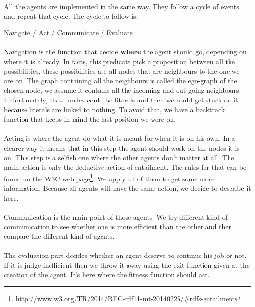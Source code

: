 \documentclass{article}
\begin{document}
		\paragraph{}
			All the agents are implemented in the same way.
			They follow a cycle of events and repeat that cycle.
			The cycle to follow is:
		\begin{center}
			Navigate / Act / Communicate / Evaluate
		\end{center}
		\paragraph{}
			Navigation is the function that decide \textbf{where} the agent should go, depending on where it is already.
			In facts, this predicate pick a proposition between all the possibilities,
			those possibilities are all nodes that are neighbours to the one we are on.
			The graph containing all the neighbours is called the ego-graph of the chosen node,
			we assume it contains all the incoming and out going neighbours.
			Unfortunately, those nodes could be literals and then we could get stuck on it because literals are linked to nothing.
			To avoid that, we have a backtrack function that keeps in mind the last position we were on.
		\paragraph{}
			Acting is where the agent do what it is meant for when it is on his own.
			In a clearer way it means that in this step the agent should work on the nodes it is on.
			This step is a selfish one where the other agents don't matter at all.
			The main action is only the deductive action of entailment.
			The rules for that can be found on the W3C web page\footnote{ \url{http://www.w3.org/TR/2014/REC-rdf11-mt-20140225/\#rdfs-entailment}}.
			We apply all of them to get some more information.
			Because all agents will have the same action, we decide to describe it here.
		\paragraph{}
			Communication is the main point of those agents.
			We try different kind of communication to see whether one is more efficient than the other
			and then compare the different kind of agents.
		\paragraph{}
			The evaluation part decides whether an agent deserve to continue his job or not.
			If it is judge inefficient then we throw it away using the exit function given at the creation of the agent.
			It's here where the fitness function should act.
\end{document}
